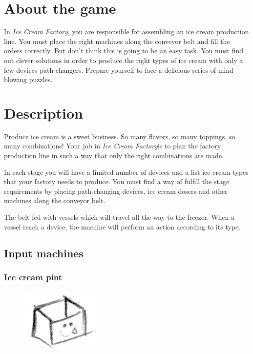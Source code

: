 \documentclass[a4paper]{scrartcl}
\title{\gamename}
\subtitle{Game Design Document}
\author{}
\date{\today}
\begin{document}
\newcommand{\gamename}{\emph{Ice Cream Factory}}

\maketitle

\section{About the game}
    In \gamename, you are responsible for assembling an ice cream production
    line. You must place the right machines along the conveyor belt and fill the
    orders correctly. But don't think this is going to be an easy task. You must
    find out clever solutions in order to produce the right types of ice cream
    with only a few devices path changers. Prepare yourself to face a delicious
    series of mind blowing puzzles.

\section{Description}
    Produce ice cream is a sweet business. So many flavors, so many toppings, so
    many combinations! Your job in \gamename is to plan the factory production
    line in such a way that only the right combinations are made.

    In each stage you will have a limited number of devices and a list ice cream
    types that your factory needs to produce. You must find a way of fulfill the
    stage requirements by placing path-changing devices, ice cream dosers and
    other machines along the conveyor belt.

    The belt fed with vessels which will travel all the way to the freezer. When
    a vessel reach a device, the machine will perform an action according to its
    type.

    \subsection{Input machines}
        \subsubsection{Ice cream pint}
            \begin{figure}
                \vspace{-15pt}
                \includegraphics[scale=1]{devices/pint}
                \vspace{-20pt}
            \end{figure}
\end{document}
